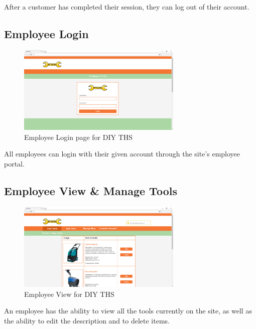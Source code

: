 After a customer has completed their session, they can log out of their
account.

\hypertarget{employee-login}{%
\subsection{Employee Login}\label{employee-login}}

\begin{figure}[H]
      \centering
      \includegraphics[trim = 0 0 0 0, clip, width=0.7\textwidth]{TempImg/adminlog.png}
      \caption{Employee Login page for DIY THS}
 \end{figure}

All employees can login with their given account through the site's
employee portal.

\hypertarget{employee-view-manage-tools}{%
\subsection{Employee View \& Manage
Tools}\label{employee-view-manage-tools}}

\begin{figure}[H]
      \centering
      \includegraphics[trim = 0 0 0 0, clip, width=0.7\textwidth]{TempImg/managetool.png}
      \caption{Employee View for DIY THS}
 \end{figure}

An employee has the ability to view all the tools currently on the site,
as well as the ability to edit the description and to delete items.


